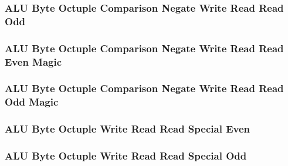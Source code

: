 

\subsubsection[{\small ALU Byte Octuple Comparison Negate Write Read Read Odd}]{ALU Byte Octuple Comparison Negate Write Read Read Odd} \label{sec:format-ALU-BOCNWRRO}



\subsubsection[{\small ALU Byte Octuple Comparison Negate Write Read Read Even Magic}]{ALU Byte Octuple Comparison Negate Write Read Read Even Magic} \label{sec:format-ALU-BOCNWRRE.M}



\subsubsection[{\small ALU Byte Octuple Comparison Negate Write Read Read Odd Magic}]{ALU Byte Octuple Comparison Negate Write Read Read Odd Magic} \label{sec:format-ALU-BOCNWRRO.M}



\subsubsection[{\small ALU Byte Octuple Write Read Read Special Even}]{ALU Byte Octuple Write Read Read Special Even} \label{sec:format-ALU-BOWRRSE}



\subsubsection[{\small ALU Byte Octuple Write Read Read Special Odd}]{ALU Byte Octuple Write Read Read Special Odd} \label{sec:format-ALU-BOWRRSO}

